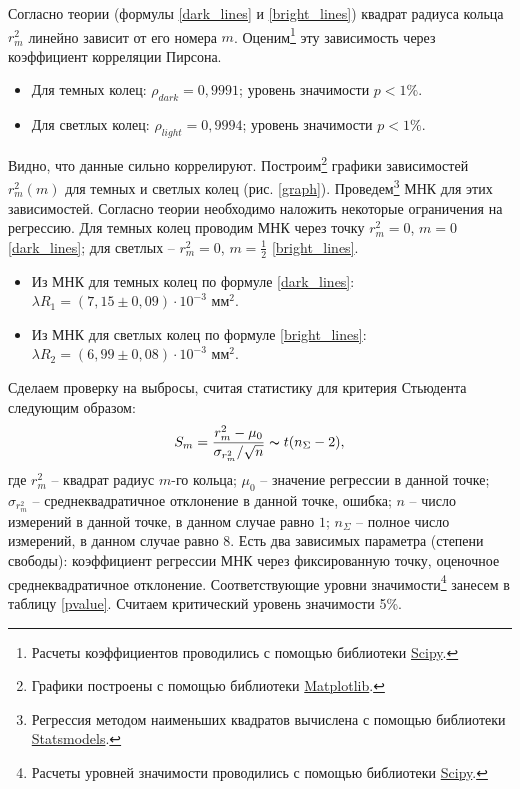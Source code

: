 \documentclass[a4paper,12pt]{article}
\theoremstyle{plain} %
\theoremstyle{definition} %
\theoremstyle{remark} %
\begin{document}
Согласно теории (формулы \eqref{dark_lines} и \eqref{bright_lines}) квадрат радиуса кольца $r^2_m$ линейно зависит от его номера $m$. Оценим\footnote{Расчеты коэффициентов проводились с помощью библиотеки \hyperref{https://docs.scipy.org/doc/scipy-0.14.0/reference/generated/scipy.stats.pearsonr.html}{}{}{Scipy}.} эту зависимость через коэффициент корреляции Пирсона.
\begin{itemize}
	\item Для темных колец: $\rho_{dark}=0,9991$; уровень значимости $p<1\%$.
	\item Для светлых колец: $\rho_{light}=0,9994$; уровень значимости $p<1\%$.
\end{itemize}

Видно, что данные сильно коррелируют. Построим\footnote{Графики построены с помощью библиотеки \hyperref{https://matplotlib.org/}{}{}{Matplotlib}.} графики зависимостей $r^2_m(m)$ для темных и светлых колец (рис. \ref{graph}). Проведем\footnote{Регрессия методом наименьших квадратов вычислена с помощью библиотеки \hyperref{http://www.statsmodels.org}{}{}{Statsmodels}.} МНК для этих зависимостей. Согласно теории необходимо наложить некоторые ограничения на регрессию. Для темных колец проводим МНК через точку $r^2_m=0$, $m=0$ \eqref{dark_lines}; для светлых --  $r^2_m=0$, $m=\frac{1}{2}$ \eqref{bright_lines}. 

\begin{itemize}
	\item Из МНК для темных колец по формуле \eqref{dark_lines}: $\lambda R_1=(7,15\pm0,09)\cdot10^{-3}$ мм$^2$.
	\item Из МНК для светлых колец по формуле \eqref{bright_lines}:  $\lambda R_2=(6,99\pm0,08)\cdot10^{-3}$ мм$^2$.
\end{itemize}

Сделаем проверку на выбросы, считая статистику для критерия Стьюдента следующим образом:
\begin{equation}
	S_m = \frac{r^2_m-\mu_0}{\sigma_{r^2_m}/\sqrt{n}} \thicksim t(n_\Sigma-2),
	\label{stats}
\end{equation}
где $r^2_m$ -- квадрат радиус $m$-го кольца; $\mu_0$ -- значение регрессии в данной точке; $\sigma_{r^2_m}$ -- среднеквадратичное отклонение в данной точке, ошибка; $n$ -- число измерений в данной точке, в данном случае равно $1$; $n_\Sigma$ -- полное число измерений, в данном случае равно $8$. Есть два зависимых параметра (степени свободы): коэффициент регрессии МНК через фиксированную точку, оценочное среднеквадратичное отклонение.  Соответствующие уровни значимости\footnote{Расчеты уровней значимости проводились с помощью библиотеки \hyperref{https://docs.scipy.org/doc/scipy/reference/generated/scipy.stats.t.html}{}{}{Scipy}.} занесем в таблицу \ref{pvalue}. Считаем критический уровень значимости 5\%.
\end{document}
